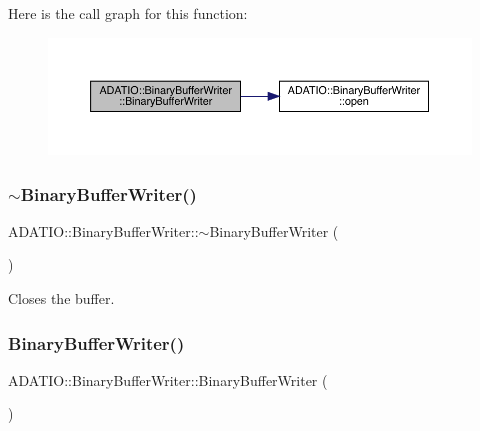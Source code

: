 Here is the call graph for this function\+:\nopagebreak
\begin{figure}[H]
\begin{center}
\leavevmode
\includegraphics[width=350pt]{d8/d90/classADATIO_1_1BinaryBufferWriter_acdbd4afbd1fde21aff3ad80d3c67a43c_cgraph}
\end{center}
\end{figure}
\mbox{\label{classADATIO_1_1BinaryBufferWriter_a1d17b712ef50e475fe7e4acfe6642547}} 
\subsubsection{\texorpdfstring{$\sim$BinaryBufferWriter()}{~BinaryBufferWriter()}\hspace{0.1cm}{\footnotesize\ttfamily [1/2]}}
{\footnotesize\ttfamily A\+D\+A\+T\+I\+O\+::\+Binary\+Buffer\+Writer\+::$\sim$\+Binary\+Buffer\+Writer (\begin{DoxyParamCaption}{ }\end{DoxyParamCaption})}



Closes the buffer. 

\mbox{\label{classADATIO_1_1BinaryBufferWriter_a3812e6b5808e6349bae019f79d78094a}} 
\subsubsection{\texorpdfstring{BinaryBufferWriter()}{BinaryBufferWriter()}\hspace{0.1cm}{\footnotesize\ttfamily [3/4]}}
{\footnotesize\ttfamily A\+D\+A\+T\+I\+O\+::\+Binary\+Buffer\+Writer\+::\+Binary\+Buffer\+Writer (\begin{DoxyParamCaption}{ }\end{DoxyParamCaption})}

